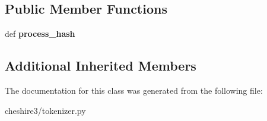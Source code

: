 \subsection*{Public Member Functions}
\begin{DoxyCompactItemize}
\item 
\hypertarget{classcheshire3_1_1tokenizer_1_1_offset_tokenizer_a7c1a1cbf3ae14c646689e953eb94d129}{def {\bfseries process\-\_\-hash}}\label{classcheshire3_1_1tokenizer_1_1_offset_tokenizer_a7c1a1cbf3ae14c646689e953eb94d129}

\end{DoxyCompactItemize}
\subsection*{Additional Inherited Members}


The documentation for this class was generated from the following file\-:\begin{DoxyCompactItemize}
\item 
cheshire3/tokenizer.\-py\end{DoxyCompactItemize}
